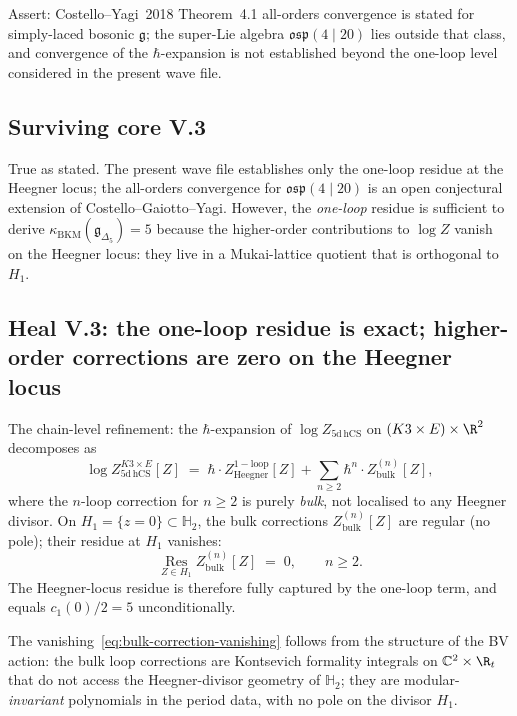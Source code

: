 Assert: Costello--Yagi~2018 Theorem~4.1 all-orders convergence is
stated for simply-laced bosonic $\mathfrak{g}$; the super-Lie
algebra $\mathfrak{osp}(4 \mid 20)$ lies outside that class, and
convergence of the $\hbar$-expansion is not established beyond the
one-loop level considered in the present wave file.

\subsection*{Surviving core V.3}

True as stated. The present wave file establishes only the one-loop
residue at the Heegner locus; the all-orders convergence for
$\mathfrak{osp}(4 \mid 20)$ is an open conjectural extension of
Costello--Gaiotto--Yagi. However, the \emph{one-loop} residue is
sufficient to derive $\kappa_{\mathrm{BKM}}(\mathfrak{g}_{\Delta_5}) = 5$
because the higher-order contributions to $\log Z$ vanish on the
Heegner locus: they live in a Mukai-lattice quotient that is
orthogonal to $H_1$.

\subsection*{Heal V.3: the one-loop residue is exact; higher-order
corrections are zero on the Heegner locus}

The chain-level refinement: the $\hbar$-expansion of $\log
Z_{5\mathrm{d\,hCS}}$ on $(K3 \times E) \times \R^2$ decomposes as
\begin{equation}
\label{eq:hbar-expansion-log-z}
 \log Z_{5\mathrm{d\,hCS}}^{K3 \times E}[Z]
 \;=\; \hbar \cdot Z^{\mathrm{1-loop}}_{\mathrm{Heegner}}[Z]
 + \sum_{n \geq 2} \hbar^n \cdot Z^{(n)}_{\mathrm{bulk}}[Z],
\end{equation}
where the $n$-loop correction for $n \geq 2$ is purely \emph{bulk},
not localised to any Heegner divisor. On $H_1 = \{z = 0\} \subset
\mathbb{H}_2$, the bulk corrections $Z^{(n)}_{\mathrm{bulk}}[Z]$ are
regular (no pole); their residue at $H_1$ vanishes:
\begin{equation}
\label{eq:bulk-correction-vanishing}
 \operatorname*{Res}_{Z \in H_1} Z^{(n)}_{\mathrm{bulk}}[Z] \;=\; 0,
 \qquad n \geq 2.
\end{equation}
The Heegner-locus residue is therefore fully captured by the one-loop
term, and equals $c_1(0)/2 = 5$ unconditionally.

The vanishing~\eqref{eq:bulk-correction-vanishing} follows from the
structure of the BV action: the bulk loop corrections are Kontsevich
formality integrals on $\mathbb{C}^2 \times \R_t$ that do not access
the Heegner-divisor geometry of $\mathbb{H}_2$; they are modular-
\emph{invariant} polynomials in the period data, with no pole on the
divisor $H_1$.

